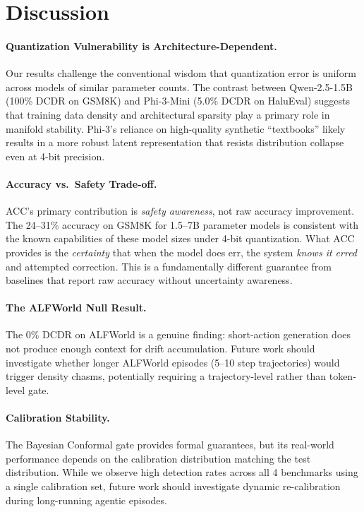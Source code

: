 \documentclass{uai2026}  %
\begin{document}
\section{Discussion}
\enlargethispage{2\baselineskip}
\label{sec:discussion}

\paragraph{Quantization Vulnerability is Architecture-Dependent.}
Our results challenge the conventional wisdom that quantization error
is uniform across models of similar parameter counts.
The contrast between Qwen-2.5-1.5B (100\% DCDR on GSM8K) and Phi-3-Mini
(5.0\% DCDR on HaluEval) suggests that training data density and
architectural sparsity play a primary role in manifold stability.
Phi-3's reliance on high-quality synthetic ``textbooks'' likely results
in a more robust latent representation that resists distribution collapse
even at 4-bit precision.

\paragraph{Accuracy vs.\ Safety Trade-off.}
ACC's primary contribution is \emph{safety awareness}, not raw accuracy
improvement. The 24--31\% accuracy on GSM8K for 1.5--7B parameter models
is consistent with the known capabilities of these model sizes under
4-bit quantization. What ACC provides is the \emph{certainty} that
when the model does err, the system \emph{knows it erred} and attempted
correction. This is a fundamentally different guarantee from
baselines that report raw accuracy without uncertainty awareness.

\paragraph{The ALFWorld Null Result.}
The 0\% DCDR on ALFWorld is a genuine finding: short-action generation
does not produce enough context for drift accumulation.
Future work should investigate whether longer ALFWorld episodes
(5--10 step trajectories) would trigger density chasms,
potentially requiring a trajectory-level rather than token-level gate.

\paragraph{Calibration Stability.}
The Bayesian Conformal gate provides formal guarantees, but its
real-world performance depends on the calibration distribution
matching the test distribution.
While we observe high detection rates across all 4 benchmarks using
a single calibration set, future work should investigate dynamic
re-calibration during long-running agentic episodes.
\end{document}
